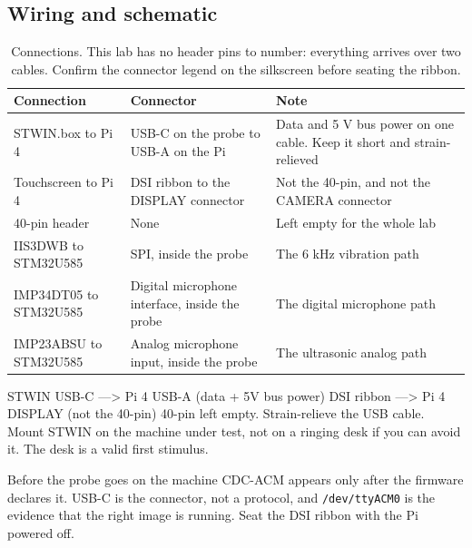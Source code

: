 \subsection*{Wiring and schematic}


\begin{table}[H]\centering\small
\begin{tabular}{p{40mm}p{44mm}p{64mm}}
\toprule
Connection & Connector & Note \\
\midrule
STWIN.box to Pi 4 & USB-C on the probe to USB-A on the Pi & Data and 5 V bus power on one cable. Keep it short and strain-relieved \\
Touchscreen to Pi 4 & DSI ribbon to the DISPLAY connector & Not the 40-pin, and not the CAMERA connector \\
40-pin header & None & Left empty for the whole lab \\
IIS3DWB to STM32U585 & SPI, inside the probe & The 6 kHz vibration path \\
IMP34DT05 to STM32U585 & Digital microphone interface, inside the probe & The digital microphone path \\
IMP23ABSU to STM32U585 & Analog microphone input, inside the probe & The ultrasonic analog path \\
\bottomrule
\end{tabular}
\caption{Connections. This lab has no header pins to number: everything arrives over two cables. Confirm the connector legend on the silkscreen before seating the ribbon.}
\end{table}

\begin{asciiart}
STWIN USB-C  --->  Pi 4 USB-A     (data + 5V bus power)
DSI ribbon   --->  Pi 4 DISPLAY   (not the 40-pin)
40-pin left empty. Strain-relieve the USB cable.
Mount STWIN on the machine under test, not on a ringing desk if you
can avoid it. The desk is a valid first stimulus.
\end{asciiart}

\begin{rulebox}{Before the probe goes on the machine}
CDC-ACM appears only after the firmware declares it. USB-C is the connector, not a protocol, and \texttt{/dev/ttyACM0} is the evidence that the right image is running. Seat the DSI ribbon with the Pi powered off.
\end{rulebox}


